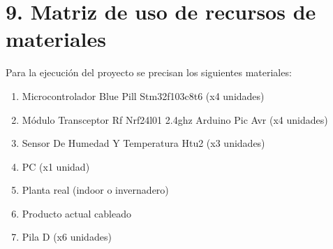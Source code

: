 \documentclass[11pt]{charter}
\begin{document}
\section{9. Matriz de uso de recursos de materiales}
\label{sec:recursos}

Para la ejecución del proyecto se precisan los siguientes materiales:

\begin{enumerate}
	\item Microcontrolador Blue Pill Stm32f103c8t6 (x4 unidades)
	\item Módulo Transceptor Rf Nrf24l01 2.4ghz Arduino Pic Avr (x4 unidades)
	\item Sensor De Humedad Y Temperatura Htu2 (x3 unidades)
	\item PC (x1 unidad)
	\item Planta real (indoor o invernadero)
	\item Producto actual cableado
	\item Pila D (x6 unidades)
\end{enumerate}
\end{document}
